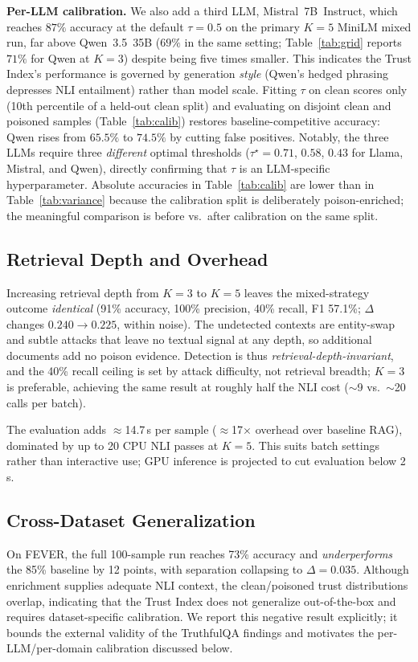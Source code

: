\textbf{Per-LLM calibration.} We also add a third LLM, Mistral~7B~Instruct, which reaches $87\%$ accuracy at the default $\tau{=}0.5$ on the primary $K{=}5$ MiniLM mixed run, far above Qwen~3.5~35B ($69\%$ in the same setting; Table~\ref{tab:grid} reports $71\%$ for Qwen at $K{=}3$) despite being five times smaller. This indicates the Trust Index's performance is governed by generation \emph{style} (Qwen's hedged phrasing depresses NLI entailment) rather than model scale. Fitting $\tau$ on clean scores only (10th percentile of a held-out clean split) and evaluating on disjoint clean and poisoned samples (Table~\ref{tab:calib}) restores baseline-competitive accuracy: Qwen rises from $65.5\%$ to $74.5\%$ by cutting false positives. Notably, the three LLMs require three \emph{different} optimal thresholds ($\tau^\star{=}0.71$, $0.58$, $0.43$ for Llama, Mistral, and Qwen), directly confirming that $\tau$ is an LLM-specific hyperparameter. Absolute accuracies in Table~\ref{tab:calib} are lower than in Table~\ref{tab:variance} because the calibration split is deliberately poison-enriched; the meaningful comparison is before vs.\ after calibration on the same split.

\subsection{Retrieval Depth and Overhead}
Increasing retrieval depth from $K{=}3$ to $K{=}5$ leaves the mixed-strategy outcome \emph{identical} (91\% accuracy, 100\% precision, 40\% recall, F1 57.1\%; $\Delta$ changes $0.240\!\to\!0.225$, within noise). The undetected contexts are entity-swap and subtle attacks that leave no textual signal at any depth, so additional documents add no poison evidence. Detection is thus \emph{retrieval-depth-invariant}, and the 40\% recall ceiling is set by attack difficulty, not retrieval breadth; $K{=}3$ is preferable, achieving the same result at roughly half the NLI cost ($\sim$9 vs.\ $\sim$20 calls per batch).

The evaluation adds $\approx$14.7\,s per sample ($\approx$17$\times$ overhead over baseline RAG), dominated by up to 20 CPU NLI passes at $K{=}5$. This suits batch settings rather than interactive use; GPU inference is projected to cut evaluation below 2\,s.

\subsection{Cross-Dataset Generalization}
On FEVER, the full 100-sample run reaches 73\% accuracy and \emph{underperforms} the 85\% baseline by 12 points, with separation collapsing to $\Delta{=}0.035$. Although enrichment supplies adequate NLI context, the clean/poisoned trust distributions overlap, indicating that the Trust Index does not generalize out-of-the-box and requires dataset-specific calibration. We report this negative result explicitly; it bounds the external validity of the TruthfulQA findings and motivates the per-LLM/per-domain calibration discussed below.

